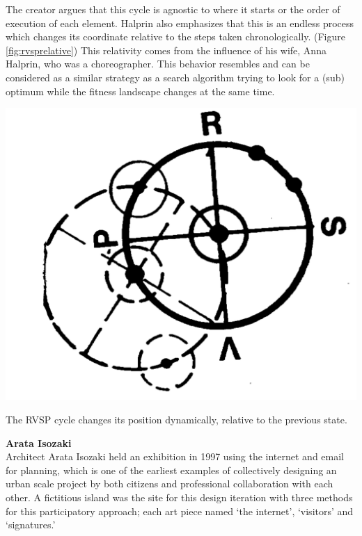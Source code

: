 The creator argues that this cycle is agnostic to where it starts or the order of execution of each element. Halprin also emphasizes that this is an endless process which changes its coordinate relative to the steps taken chronologically. (Figure \ref{fig:rvsprelative})
This relativity comes from the influence of his wife, Anna Halprin, who was a choreographer.
This behavior resembles and can be considered as a similar strategy as a search algorithm trying to look for a (sub) optimum while the fitness landscape changes at the same time.


\begin{marginfigure}
  \includegraphics[width=\textwidth]{chapters/3/fig/rvsp_relative.png}               
  \caption{The RVSP cycle changes its position dynamically, relative to the previous state.\cite{halrprin1969rsvp}}
  \label{fig:rvsprelative}
\end{marginfigure}

\textbf{Arata Isozaki}\\
Architect Arata Isozaki held an exhibition in 1997 using the internet and email for planning, which is one of the earliest examples of collectively designing an urban scale project by both citizens and professional collaboration with each other. A fictitious island was the site for this design iteration with three methods for this participatory approach; each art piece named `the internet', `visitors' and `signatures.'

